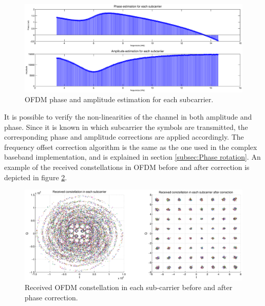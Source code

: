 \documentclass[12pt,a4paper,openright]{report}
\begin{document}
\begin{figure}[h]
  \centering
    \includegraphics[width=1\textwidth]{OFDMchannelestim.eps}
    \caption[OFDM phase and amplitude estimation for each subcarrier.]{OFDM phase and amplitude estimation for each subcarrier.}
    \label{fig:OFDMphase-amp}
\end{figure}


It is possible to verify the non-linearities of the channel in both amplitude and phase. Since it is known in which subcarrier the symbols are transmitted, the corresponding phase and amplitude corrections are applied accordingly. The frequency offset correction algorithm is the same as the one used in the complex baseband implementation, and is explained in section \ref{subsec:Phase rotation}. An example of the received constellations in OFDM before and after correction is depicted in figure \ref{fig:OFDMconst}.

\begin{figure}[h]
  \centering
    \includegraphics[width=1\textwidth]{ofdm64const.eps}
    \caption[Received OFDM constellation in each sub-carrier before and after phase correction.]{Received OFDM constellation in each sub-carrier before and after phase correction.}
    \label{fig:OFDMconst}
\end{figure}
\end{document}
